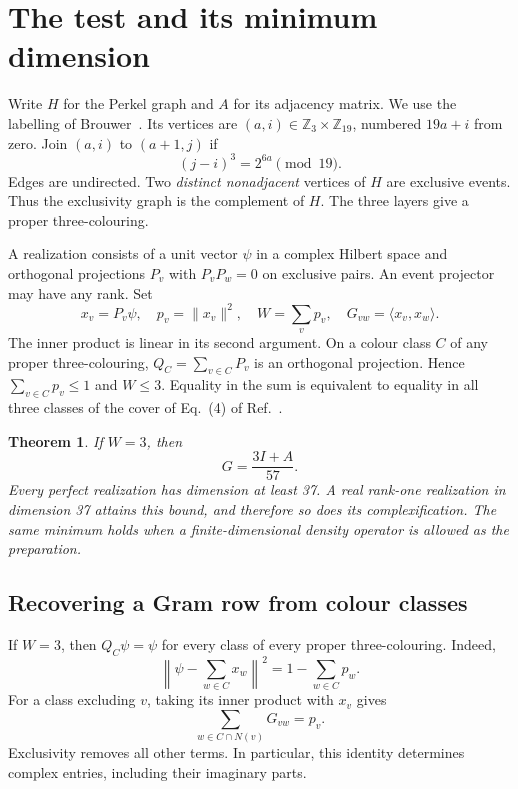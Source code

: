 \documentclass[11pt]{article}
\newtheorem{theorem}{Theorem}
\newcommand{\ip}[2]{\langle #1,#2\rangle}
\begin{document}
\section{The test and its minimum dimension}
Write $H$ for the Perkel graph and $A$ for its adjacency matrix. We use the labelling of Brouwer~\cite{brouwer}. Its vertices are $(a,i)\in\mathbb Z_3\times\mathbb Z_{19}$, numbered $19a+i$ from zero. Join $(a,i)$ to $(a+1,j)$ if
\begin{equation}
 (j-i)^3=2^{6a}\pmod {19}. \label{eq:edges}
\end{equation}
Edges are undirected. Two \emph{distinct nonadjacent} vertices of $H$ are exclusive events. Thus the exclusivity graph is the complement of $H$. The three layers give a proper three-colouring.

A realization consists of a unit vector $\psi$ in a complex Hilbert space and orthogonal projections $P_v$ with $P_vP_w=0$ on exclusive pairs. An event projector may have any rank. Set
\[
 x_v=P_v\psi,\quad p_v=\|x_v\|^2,\quad W=\sum_v p_v,\quad
 G_{vw}=\ip{x_v}{x_w}.
\]
The inner product is linear in its second argument. On a colour class $C$ of any proper three-colouring, $Q_C=\sum_{v\in C}P_v$ is an orthogonal projection. Hence $\sum_{v\in C}p_v\leq 1$ and $W\leq3$. Equality in the sum is equivalent to equality in all three classes of the cover of Eq.~(4) of Ref.~\cite{liu}.

\begin{theorem}\label{th:main}
If $W=3$, then
\begin{equation}
        G=\frac{3I+A}{57}. \label{eq:gram}
\end{equation}
Every perfect realization has dimension at least 37. A real rank-one realization in dimension 37 attains this bound, and therefore so does its complexification. The same minimum holds when a finite-dimensional density operator is allowed as the preparation.
\end{theorem}

\subsection{Recovering a Gram row from colour classes}
If $W=3$, then $Q_C\psi=\psi$ for every class of every proper three-colouring. Indeed,
\begin{equation}
 \left\|\psi-\sum_{w\in C}x_w\right\|^2
       =1-\sum_{w\in C}p_w. \label{eq:deficit}
\end{equation}
For a class excluding $v$, taking its inner product with $x_v$ gives
\begin{equation}
       \sum_{w\in C\cap N(v)}G_{vw}=p_v. \label{eq:local}
\end{equation}
Exclusivity removes all other terms. In particular, this identity determines complex entries, including their imaginary parts.
\end{document}
